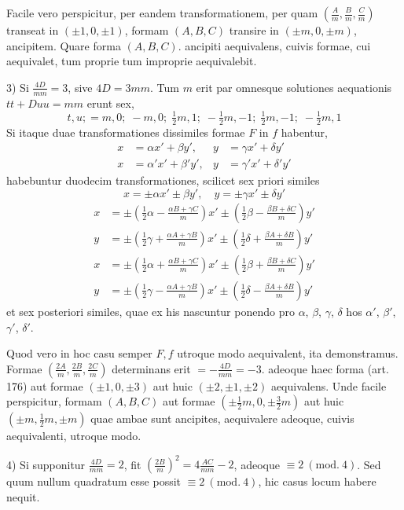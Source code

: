 Facile vero perspicitur, per eandem transformationem, per quam $(\frac{A}{m},\frac{B}{m},\frac{C}{m})$ transeat in $(\pm1,0,\pm1)$, formam $(A,B,C)$ transire in $(\pm m,0,\pm m)$, ancipitem. Quare forma $(A,B,C)$. ancipiti aequivalens, cuivis formae, cui aequivalet, tum proprie tum improprie aequivalebit.

3) Si $\frac{4D}{mm}=3$, sive $4D=3mm$. Tum $m$ erit par omnesque solutiones aequationis $tt+Duu=mm$ erunt sex,
\[
t,u;=m,0;\;-m,0;\;\tfrac12m,1;\;-\tfrac12m,-1;\;\tfrac12m,-1;\;-\tfrac12m,1
\]
Si itaque duae transformationes dissimiles formae $F$ in $f$ habentur,
\[
\begin{aligned}
x&=\alpha x'+\beta y',& y&=\gamma x'+\delta y'\\
x&=\alpha'x'+\beta'y',& y&=\gamma'x'+\delta'y'
\end{aligned}
\]
habebuntur duodecim transformationes, scilicet sex priori similes
\[
x=\pm\alpha x'\pm\beta y',\quad y=\pm\gamma x'\pm\delta y'
\]
\[
\begin{aligned}
x&=\pm(\tfrac12\alpha-\tfrac{\alpha B+\gamma C}{m})x'\pm(\tfrac12\beta-\tfrac{\beta B+\delta C}{m})y'\\
y&=\pm(\tfrac12\gamma+\tfrac{\alpha A+\gamma B}{m})x'\pm(\tfrac12\delta+\tfrac{\beta A+\delta B}{m})y'
\end{aligned}
\]
\[
\begin{aligned}
x&=\pm(\tfrac12\alpha+\tfrac{\alpha B+\gamma C}{m})x'\pm(\tfrac12\beta+\tfrac{\beta B+\delta C}{m})y'\\
y&=\pm(\tfrac12\gamma-\tfrac{\alpha A+\gamma B}{m})x'\pm(\tfrac12\delta-\tfrac{\beta A+\delta B}{m})y'
\end{aligned}
\]
et sex posteriori similes, quae ex his nascuntur ponendo pro $\alpha$, $\beta$, $\gamma$, $\delta$ hos $\alpha'$, $\beta'$, $\gamma'$, $\delta'$.

Quod vero in hoc casu semper $F,f$ utroque modo aequivalent, ita demonstramus. Formae $(\frac{2A}{m},\frac{2B}{m},\frac{2C}{m})$ determinans erit $=-\frac{4D}{mm}=-3$. adeoque haec forma (art. 176) aut formae $(\pm1,0,\pm3)$ aut huic $(\pm2,\pm1,\pm2)$ aequivalens. Unde facile perspicitur, formam $(A,B,C)$ aut formae $(\pm\tfrac12m,0,\pm\tfrac32m)$ aut huic $(\pm m,\tfrac12m,\pm m)$ quae ambae sunt ancipites, aequivalere adeoque, cuivis aequivalenti, utroque modo.

4) Si supponitur $\frac{4D}{mm}=2$, fit $(\frac{2B}{m})^2=4\frac{AC}{mm}-2$, adeoque $\equiv2\ (\mathrm{mod.}\ 4)$.
Sed quum nullum quadratum esse possit $\equiv2\ (\mathrm{mod.}\ 4)$, hic casus locum habere nequit.

